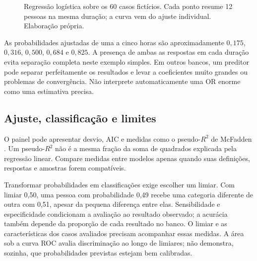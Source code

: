 \begin{figure}[H]
\centering
{}
\caption{Regressão logística sobre os 60 casos fictícios. Cada ponto resume 12 pessoas na mesma duração; a curva vem do ajuste individual. Elaboração própria.}
\label{fig:logistica}
\end{figure}

As probabilidades ajustadas de uma a cinco horas são aproximadamente $0{,}175$, $0{,}316$, $0{,}500$, $0{,}684$ e $0{,}825$. A presença de ambas as respostas em cada duração evita separação completa neste exemplo simples. Em outros bancos, um preditor pode separar perfeitamente os resultados e levar a coeficientes muito grandes ou problemas de convergência. Não interprete automaticamente uma OR enorme como uma estimativa precisa.

\subsection{Ajuste, classificação e limites}

O painel pode apresentar desvio, AIC e medidas como o pseudo-$R^2$ de McFadden \parencite{JamoviLogisticaCodigo}. Um pseudo-$R^2$ não é a mesma fração da soma de quadrados explicada pela regressão linear. Compare medidas entre modelos apenas quando suas definições, respostas e amostras forem compatíveis.

Transformar probabilidades em classificações exige escolher um limiar. Com limiar 0,50, uma pessoa com probabilidade 0,49 recebe uma categoria diferente de outra com 0,51, apesar da pequena diferença entre elas. Sensibilidade e especificidade condicionam a avaliação ao resultado observado; a acurácia também depende da proporção de cada resultado no banco. O limiar e as características dos casos avaliados precisam acompanhar essas medidas. A área sob a curva ROC avalia discriminação ao longo de limiares; não demonstra, sozinha, que probabilidades previstas estejam bem calibradas.

